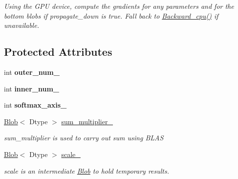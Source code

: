 \begin{DoxyCompactItemize}
\begin{DoxyCompactList}\small\item\em Using the G\+PU device, compute the gradients for any parameters and for the bottom blobs if propagate\+\_\+down is true. Fall back to \hyperlink{classcaffe_1_1SoftmaxLayer_af6eb03743a1530477dc680856a54e444}{Backward\+\_\+cpu()} if unavailable. \end{DoxyCompactList}\end{DoxyCompactItemize}
\subsection*{Protected Attributes}
\begin{DoxyCompactItemize}
\item 
int {\bfseries outer\+\_\+num\+\_\+}\hypertarget{classcaffe_1_1SoftmaxLayer_abb41226ecdb5e1c5a89336c680186637}{}\label{classcaffe_1_1SoftmaxLayer_abb41226ecdb5e1c5a89336c680186637}

\item 
int {\bfseries inner\+\_\+num\+\_\+}\hypertarget{classcaffe_1_1SoftmaxLayer_a05182b1721808e2706e54ad6d6462d0c}{}\label{classcaffe_1_1SoftmaxLayer_a05182b1721808e2706e54ad6d6462d0c}

\item 
int {\bfseries softmax\+\_\+axis\+\_\+}\hypertarget{classcaffe_1_1SoftmaxLayer_a48792959064b3d211e0ef48f1a429bc6}{}\label{classcaffe_1_1SoftmaxLayer_a48792959064b3d211e0ef48f1a429bc6}

\item 
\hyperlink{classcaffe_1_1Blob}{Blob}$<$ Dtype $>$ \hyperlink{classcaffe_1_1SoftmaxLayer_a3bfc4000b464ab32c73060a2d5c4e426}{sum\+\_\+multiplier\+\_\+}\hypertarget{classcaffe_1_1SoftmaxLayer_a3bfc4000b464ab32c73060a2d5c4e426}{}\label{classcaffe_1_1SoftmaxLayer_a3bfc4000b464ab32c73060a2d5c4e426}

\begin{DoxyCompactList}\small\item\em sum\+\_\+multiplier is used to carry out sum using B\+L\+AS \end{DoxyCompactList}\item 
\hyperlink{classcaffe_1_1Blob}{Blob}$<$ Dtype $>$ \hyperlink{classcaffe_1_1SoftmaxLayer_a22a5348d7a31c512ac9d5dcfc066d4b1}{scale\+\_\+}\hypertarget{classcaffe_1_1SoftmaxLayer_a22a5348d7a31c512ac9d5dcfc066d4b1}{}\label{classcaffe_1_1SoftmaxLayer_a22a5348d7a31c512ac9d5dcfc066d4b1}

\begin{DoxyCompactList}\small\item\em scale is an intermediate \hyperlink{classcaffe_1_1Blob}{Blob} to hold temporary results. \end{DoxyCompactList}\end{DoxyCompactItemize}


